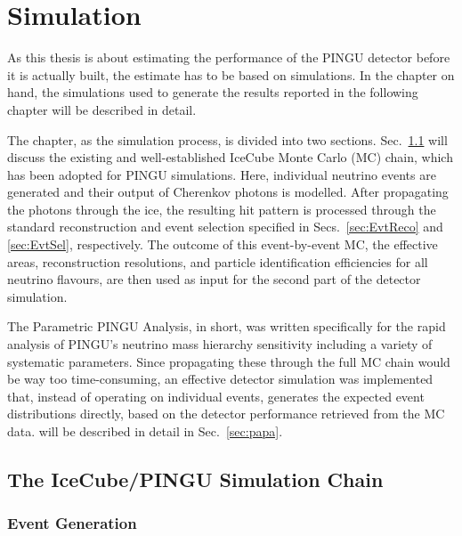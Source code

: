 \chapter{Simulation}
\label{sec:sim}

As this thesis is about estimating the performance of the PINGU detector before
it is actually built, the estimate has to be based on simulations. In the
chapter on hand, the simulations used to generate the results reported in the
following chapter will be described in detail.

The chapter, as the simulation process, is divided into two sections.
Sec.~\ref{sec:sim_MCchain} will discuss the existing and well-established
IceCube Monte Carlo (MC) chain, which has been adopted for PINGU simulations.
Here, individual neutrino events are generated and their output of Cherenkov
photons is modelled. After propagating the photons through the ice, the
resulting hit pattern is processed through the standard reconstruction and event
selection specified in Secs.~\ref{sec:EvtReco} and \ref{sec:EvtSel},
respectively. The outcome of this event-by-event MC, \ie the effective
areas, reconstruction resolutions, and particle identification efficiencies for
all neutrino flavours, are then used as input for the second part of the
detector simulation.

The Parametric PINGU Analysis, \papa in short, was written specifically for the
rapid analysis of PINGU's neutrino mass hierarchy sensitivity including a
variety of systematic parameters. Since propagating these through the full
MC chain would be way too time-consuming, an effective detector
simulation was implemented that, instead of operating on individual events,
generates the expected event distributions directly, based on the detector
performance retrieved from the MC data. \papa will be described in
detail in Sec.~\ref{sec:papa}.

\section{The IceCube/PINGU Simulation Chain}
\label{sec:sim_MCchain}

\subsection{Event Generation}
\label{sec:MC_genie}


